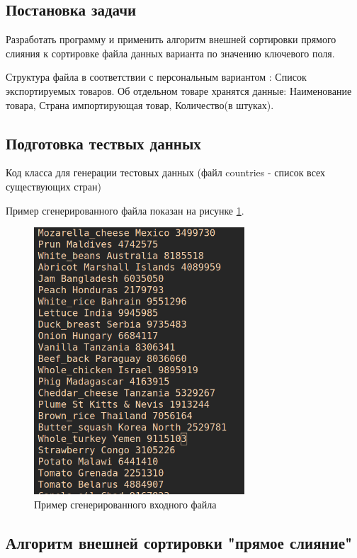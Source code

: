 \documentclass[a4paper, 14pt]{extarticle}
\begin{document}
\subsection{Постановка задачи}
Разработать программу и применить алгоритм внешней сортировки
прямого слияния к сортировке файла данных варианта по значению
ключевого поля.

Структура файла в соответствии с персональным вариантом :
Список экспортируемых товаров. Об отдельном товаре хранятся данные:
Наименование товара, Страна импортирующая товар, Количество(в штуках).
\subsection{Подготовка тествых данных}
Код класса для генерации тестовых данных (файл countries - список всех существующих стран)



Пример сгенерированного файла показан на рисунке \ref{fig:test_file}.
\begin{figure}[htpb]
  \centering
  \includegraphics[width=0.7\textwidth]{pictures/test_file.png}
  \caption{Пример сгенерированного входного файла}
  \label{fig:test_file}
\end{figure}

\subsection{Алгоритм внешней сортировки "прямое слияние"}
\end{document}
